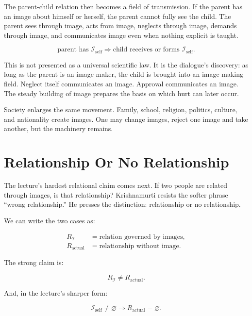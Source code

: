 The parent-child relation then becomes a field of transmission. If the parent has an image about himself or herself, the parent cannot fully see the child. The parent sees through image, acts from image, neglects through image, demands through image, and communicates image even when nothing explicit is taught.

\begin{equation}
\text{parent has }\mathcal{I}_{\text{self}}
\Rightarrow
\text{child receives or forms }\mathcal{I}_{\text{self}}.
\end{equation}

This is not presented as a universal scientific law. It is the dialogue's discovery: as long as the parent is an image-maker, the child is brought into an image-making field. Neglect itself communicates an image. Approval communicates an image. The steady building of image prepares the basis on which hurt can later occur.

Society enlarges the same movement. Family, school, religion, politics, culture, and nationality create images. One may change images, reject one image and take another, but the machinery remains.

\section{Relationship Or No Relationship}

The lecture's hardest relational claim comes next. If two people are related through images, is that relationship? Krishnamurti resists the softer phrase ``wrong relationship.'' He presses the distinction: relationship or no relationship.

We can write the two cases as:

\begin{align}
R_{\mathcal{I}} &= \text{relation governed by images}, \\
R_{\text{actual}} &= \text{relationship without image}.
\end{align}

The strong claim is:

\begin{equation}
R_{\mathcal{I}} \neq R_{\text{actual}}.
\end{equation}

And, in the lecture's sharper form:

\begin{equation}
\mathcal{I}_{\text{self}} \neq \varnothing
\Rightarrow
R_{\text{actual}} = \varnothing.
\end{equation}


